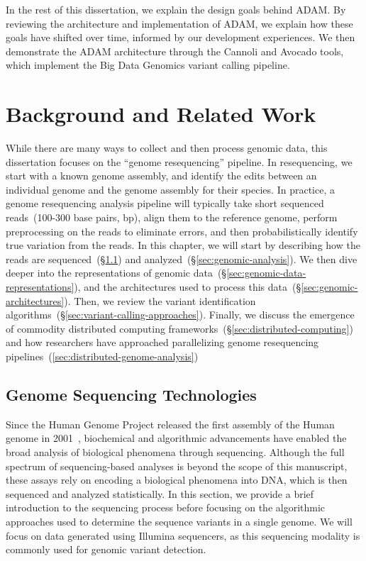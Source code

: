 \documentclass[phd]{ucbthesis}
\begin{document}
In the rest of this dissertation, we explain the design goals behind 
{ADAM}. By reviewing the architecture and implementation of
{ADAM}, we explain how these goals have shifted over time, informed by
our development experiences. We then demonstrate the {ADAM} architecture
through the {Cannoli} and {Avocado} tools, which implement the
{Big Data Genomics} variant calling pipeline.

\chapter{Background and Related Work}
\label{chap:background}

While there are many ways to collect and then process genomic data, this
dissertation focuses on the ``genome resequencing'' pipeline. In resequencing,
we start with a known genome assembly, and identify the edits between an
individual genome and the genome assembly for their species. In practice, a
genome resequencing analysis pipeline will typically take short sequenced
reads~(100-300 base pairs, bp), align them to the reference genome, perform
preprocessing on the reads to eliminate errors, and then probabilistically
identify true variation from the reads. In this chapter, we will start by
describing how the reads are sequenced~(\S\ref{sec:genome-sequencing}) and
analyzed~(\S\ref{sec:genomic-analysis}). We then dive deeper into the
representations of genomic data~(\S\ref{sec:genomic-data-representations}),
and the architectures used to process this
data~(\S\ref{sec:genomic-architectures}). Then, we review the variant
identification algorithms~(\S\ref{sec:variant-calling-approaches}). Finally,
we discuss the emergence of commodity distributed computing
frameworks~(\S\ref{sec:distributed-computing}) and how researchers have
approached parallelizing genome resequencing
pipelines~(\ref{sec:distributed-genome-analysis})

\section{Genome Sequencing Technologies}
\label{sec:genome-sequencing}

Since the Human Genome Project released the first assembly of the Human genome
in 2001~\cite{lander01}, biochemical and algorithmic advancements have enabled
the broad analysis of biological phenomena through sequencing. Although the
full spectrum of sequencing-based analyses is beyond the scope of this
manuscript, these assays rely on encoding a biological phenomena into DNA, which
is then sequenced and analyzed statistically. In this section, we provide a
brief introduction to the sequencing process before focusing on the algorithmic
approaches used to determine the sequence variants in a single genome. We will
focus on data generated using Illumina sequencers, as this sequencing modality
is commonly used for genomic variant detection.
\end{document}
